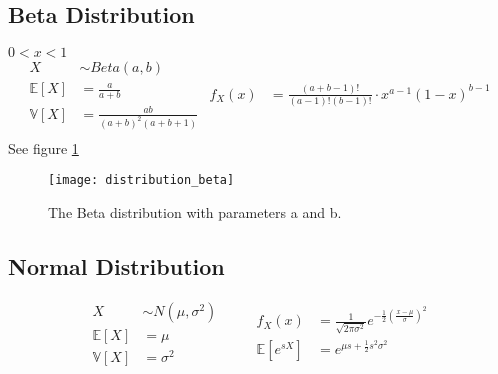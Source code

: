 \subsection{Beta Distribution}
\(0 < x < 1\)
\begin{equation*}
    \begin{aligned}
        X &\sim Beta(a, b) \qquad\\
        \mathbb{E}[X] &= \frac{a}{a + b} \\
        \mathbb{V}[X] &= \frac{ab}{(a + b)^2(a + b + 1)}\\
    \end{aligned}
    \begin{aligned}
        f_X(x) &= \frac{(a + b - 1)!}{(a - 1)! (b - 1)!} \cdot x^{a-1} (1 - x)^{b-1} \\
    \end{aligned}
\end{equation*}
See figure \ref{fig:distribution_beta}
\begin{figure}[t]
    \centering
    \texttt{[image: distribution\_beta]}
    \caption{The Beta distribution with parameters a and b.}
    \label{fig:distribution_beta}
\end{figure}

\subsection{Normal Distribution}
\begin{equation*}
    \begin{aligned}
        X &\sim N(\mu, \sigma^2) \qquad\\
        \mathbb{E}[X] &= \mu \\
        \mathbb{V}[X] &= \sigma^2 \\
    \end{aligned}
    \begin{aligned}
        f_X(x) &= \frac{1}{\sqrt{2\pi\sigma^2}} e^{-\frac{1}{2}\left(\frac{x - \mu}{\sigma}\right)^2} \\
        \mathbb{E}[e^{sX}] &= e^{\mu s + \frac{1}{2}s^2\sigma^2} \\
    \end{aligned}
\end{equation*}

